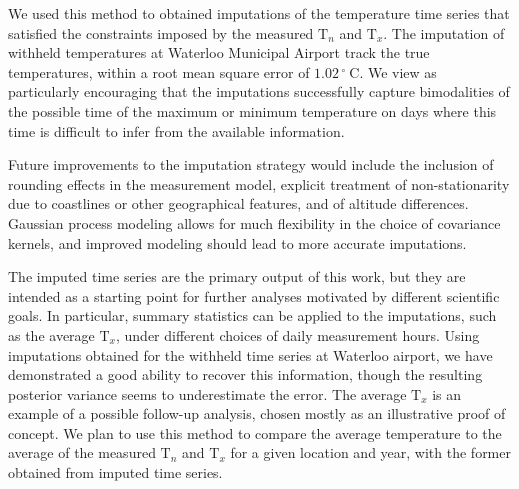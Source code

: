 \documentclass[letter]{article}
\newcommand{\T}{\mathrm{T}}
\newcommand{\Tn}{\T_{n}}
\newcommand{\Tx}{\T_{x}}
\newcommand{\degreeC}{{}^{\circ}~\mathrm{C}}
\begin{document}
We used this method to obtained imputations of the temperature time series that satisfied the constraints imposed by the measured \(\Tn\) and \(\Tx\).
The imputation of withheld temperatures at Waterloo Municipal Airport track the true temperatures, within a root mean square error of \(1.02\,\degreeC\).
We view as particularly encouraging that the imputations successfully capture bimodalities of the possible time of the maximum or minimum temperature on days where this time is difficult to infer from the available information.

Future improvements to the imputation strategy would include the inclusion of rounding effects in the measurement model, explicit treatment of non-stationarity due to coastlines or other geographical features, and of altitude differences.
Gaussian process modeling allows for much flexibility in the choice of covariance kernels, and improved modeling should lead to more accurate imputations.


        The imputed time series are the primary output of this work, but they are intended as a starting point for further analyses motivated by different scientific goals.
In particular, summary statistics can be applied to the imputations, such as the average \(\Tx\), under different choices of daily measurement hours.
Using imputations obtained for the withheld time series at Waterloo airport, we have demonstrated a good ability to recover this information, though the resulting posterior variance seems to underestimate the error.
The average \(\Tx\) is an example of a possible follow-up analysis, chosen mostly as an illustrative proof of concept.
We plan to use this method to compare the average temperature to the average of the measured \(\Tn\) and \(\Tx\) for a given location and year, with the former obtained from imputed time series.
    
\end{document}
